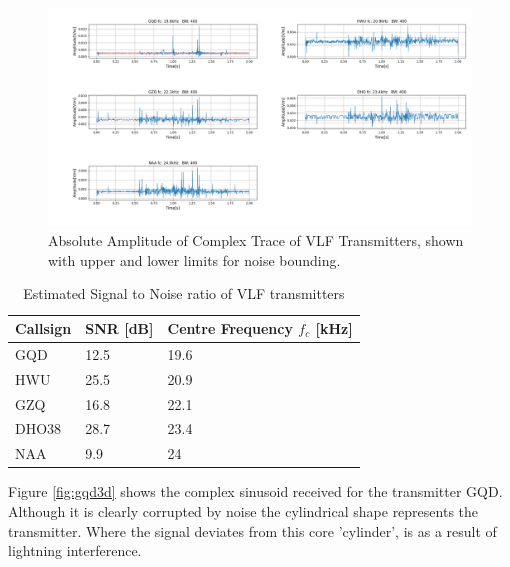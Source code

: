 \begin{figure}[h!]
    \centering
    \includegraphics[width = \textwidth]{figs/sig_character/abs_amplitude.png}
    \caption{\centering Absolute Amplitude of Complex Trace of VLF Transmitters, shown with upper and lower limits for noise bounding.}
    \label{fig:absAmplitude}
\end{figure}

\begin{table}[h!]
\centering
    \begin{tabular}{l|l|l}
    Callsign & SNR [dB] & Centre Frequency $f_c$ [kHz] \\
    \hline
    GQD & 12.5 & 19.6 \\
    HWU & 25.5 & 20.9 \\
    GZQ & 16.8 & 22.1 \\
    DHO38 & 28.7 & 23.4 \\
    NAA & 9.9 & 24
    \end{tabular}
\caption{Estimated Signal to Noise ratio of VLF transmitters}
\label{tab:snr1}
\end{table}

Figure \ref{fig:gqd3d} shows the complex sinusoid received for the transmitter GQD. Although it is clearly corrupted by noise the cylindrical shape represents the transmitter. Where the signal deviates from this core 'cylinder', is as a result of lightning interference.

